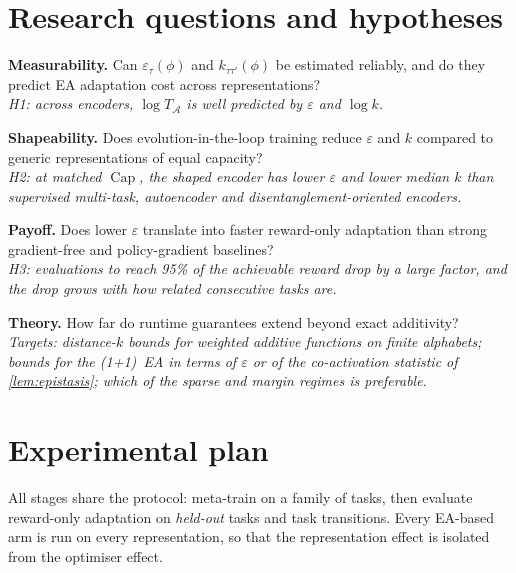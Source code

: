 \documentclass[11pt,a4paper]{article}
\theoremstyle{definition}
\theoremstyle{plain}
\theoremstyle{remark}
\newcommand{\Capa}{\operatorname{Cap}}
\begin{document}
\section{Research questions and hypotheses}
\label{sec:rq}

\begin{description}[leftmargin=1.2cm,style=nextline]
\item[RQ1] \textbf{Measurability.} Can $\varepsilon_\tau(\phi)$ and $k_{\tau\tau'}(\phi)$ be estimated reliably, and do they predict EA adaptation cost across representations?\\
\emph{H1: across encoders, $\log T_\mathcal{A}$ is well predicted by $\varepsilon$ and $\log k$.}
\item[RQ2] \textbf{Shapeability.} Does evolution-in-the-loop training reduce $\varepsilon$ and $k$ compared to generic representations of equal capacity?\\
\emph{H2: at matched $\Capa$, the shaped encoder has lower $\varepsilon$ and lower median $k$ than supervised multi-task, autoencoder and disentanglement-oriented encoders.}
\item[RQ3] \textbf{Payoff.} Does lower $\varepsilon$ translate into faster reward-only adaptation than strong gradient-free and policy-gradient baselines?\\
\emph{H3: evaluations to reach 95\% of the achievable reward drop by a large factor, and the drop grows with how related consecutive tasks are.}
\item[RQ4] \textbf{Theory.} How far do runtime guarantees extend beyond exact additivity?\\
\emph{Targets: distance-$k$ bounds for weighted additive functions on finite alphabets; bounds for the (1+1)~EA in terms of $\varepsilon$ or of the co-activation statistic of \cref{lem:epistasis}; which of the sparse and margin regimes is preferable.}
\end{description}

\section{Experimental plan}
\label{sec:experiments}

All stages share the protocol: meta-train on a family of tasks, then evaluate reward-only adaptation on \emph{held-out} tasks and task transitions. Every EA-based arm is run on every representation, so that the representation effect is isolated from the optimiser effect.
\end{document}
